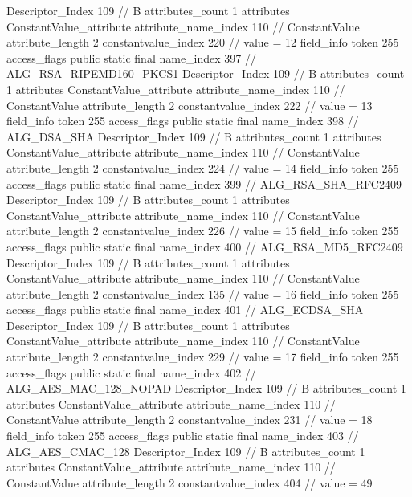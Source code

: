 {{{{{				Descriptor_Index	109		// B
				attributes_count	1
				attributes {
				ConstantValue_attribute {
					attribute_name_index	110		// ConstantValue
					attribute_length	2
					constantvalue_index	220		// value = 12
				}
				}
			}
			field_info {
				token	255
				access_flags	public static final
				name_index	397		// ALG_RSA_RIPEMD160_PKCS1
				Descriptor_Index	109		// B
				attributes_count	1
				attributes {
				ConstantValue_attribute {
					attribute_name_index	110		// ConstantValue
					attribute_length	2
					constantvalue_index	222		// value = 13
				}
				}
			}
			field_info {
				token	255
				access_flags	public static final
				name_index	398		// ALG_DSA_SHA
				Descriptor_Index	109		// B
				attributes_count	1
				attributes {
				ConstantValue_attribute {
					attribute_name_index	110		// ConstantValue
					attribute_length	2
					constantvalue_index	224		// value = 14
				}
				}
			}
			field_info {
				token	255
				access_flags	public static final
				name_index	399		// ALG_RSA_SHA_RFC2409
				Descriptor_Index	109		// B
				attributes_count	1
				attributes {
				ConstantValue_attribute {
					attribute_name_index	110		// ConstantValue
					attribute_length	2
					constantvalue_index	226		// value = 15
				}
				}
			}
			field_info {
				token	255
				access_flags	public static final
				name_index	400		// ALG_RSA_MD5_RFC2409
				Descriptor_Index	109		// B
				attributes_count	1
				attributes {
				ConstantValue_attribute {
					attribute_name_index	110		// ConstantValue
					attribute_length	2
					constantvalue_index	135		// value = 16
				}
				}
			}
			field_info {
				token	255
				access_flags	public static final
				name_index	401		// ALG_ECDSA_SHA
				Descriptor_Index	109		// B
				attributes_count	1
				attributes {
				ConstantValue_attribute {
					attribute_name_index	110		// ConstantValue
					attribute_length	2
					constantvalue_index	229		// value = 17
				}
				}
			}
			field_info {
				token	255
				access_flags	public static final
				name_index	402		// ALG_AES_MAC_128_NOPAD
				Descriptor_Index	109		// B
				attributes_count	1
				attributes {
				ConstantValue_attribute {
					attribute_name_index	110		// ConstantValue
					attribute_length	2
					constantvalue_index	231		// value = 18
				}
				}
			}
			field_info {
				token	255
				access_flags	public static final
				name_index	403		// ALG_AES_CMAC_128
				Descriptor_Index	109		// B
				attributes_count	1
				attributes {
				ConstantValue_attribute {
					attribute_name_index	110		// ConstantValue
					attribute_length	2
					constantvalue_index	404		// value = 49
}}}}}}}
